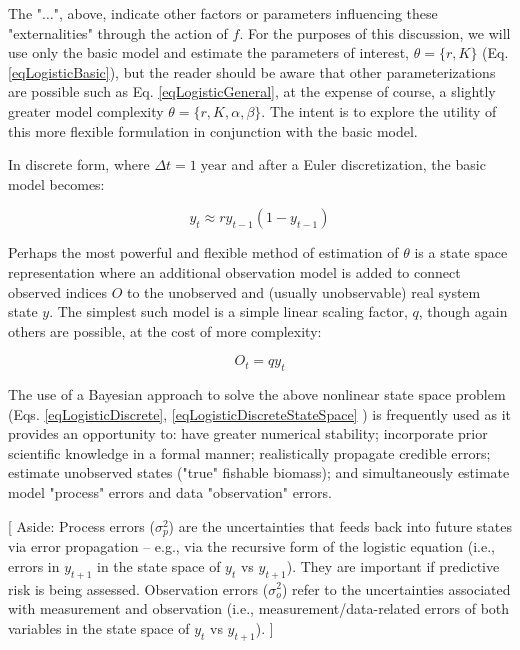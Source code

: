 \documentclass[letterpaper,portrait,11pt]{scrartcl}
\numberwithin{equation}{section}		%
\numberwithin{figure}{section}		%
\numberwithin{table}{section}				%
\begin{document}
The "$\dots$", above, indicate other factors or parameters influencing these "externalities" through the action of $f$. For the purposes of this discussion, we will use only the basic model and estimate the parameters of interest, $\theta = \{r, K \}$ (Eq. \ref{eqLogisticBasic}), but the reader should be aware that other parameterizations are possible such as Eq. \ref{eqLogisticGeneral}, at the expense of course, a slightly greater model complexity $\theta=\{r,K,\alpha,\beta\}$. The intent is to explore the utility of this more flexible formulation in conjunction with the basic model. 

In discrete form, where $\Delta t = 1 \; \text{year}$ and after a Euler discretization, the basic model becomes:

\begin{equation} 
\label{eqLogisticDiscrete}
y_t  \approx r y_{t-1} (1 - y_{t-1} )
\end{equation}

Perhaps the most powerful and flexible method of estimation of $\theta$ is a state space representation where an additional observation model is added to connect observed indices $O$ to the unobserved and (usually unobservable) real system state $y$. The simplest such model is a simple linear scaling factor, $q$, though again others are possible, at the cost of more complexity: 

\begin{equation} 
\label{eqLogisticDiscreteStateSpace}
O_t = q y_t
\end{equation}


The use of a Bayesian approach to solve the above nonlinear state space problem (Eqs. \ref{eqLogisticDiscrete}, \ref{eqLogisticDiscreteStateSpace} ) is frequently used as it provides an opportunity to: have greater numerical stability; incorporate prior scientific knowledge in a formal manner; realistically propagate credible errors; estimate unobserved states ("true" fishable biomass); and simultaneously estimate model "process" errors and data "observation" errors. 

[ Aside: Process errors ($\sigma^2_p$) are the uncertainties that feeds back into future states via error propagation -- e.g., via the recursive form of the logistic equation (i.e., errors in $y_{t+1}$ in the state space of $y_t$ vs $y_{t+1}$). They are important if predictive risk is being assessed. Observation errors ($\sigma^2_o$) refer to the uncertainties associated with measurement and observation (i.e., measurement/data-related errors of both variables in the state space of $y_t$ vs $y_{t+1}$). ]
\end{document}
